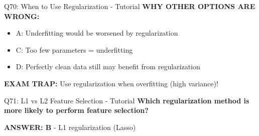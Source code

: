 \documentclass[8pt]{beamer}
\begin{document}
\begin{frame}{Q70: When to Use Regularization - Tutorial}
		\vspace{0.05cm}
		\textcolor{myred}{\textbf{WHY OTHER OPTIONS ARE WRONG:}}
		\begin{itemize}
			\item \textcolor{myred}{A:} Underfitting would be worsened by regularization
			\item \textcolor{myred}{C:} Too few parameters = underfitting
			\item \textcolor{myred}{D:} Perfectly clean data still may benefit from regularization
		\end{itemize}
		
		\textcolor{myred}{\textbf{EXAM TRAP:}} Use regularization when overfitting (high variance)!
	\end{frame}
	
	\begin{frame}{Q71: L1 vs L2 Feature Selection - Tutorial}
		\fontsize{6.5}{7.5}\selectfont
		\textbf{Which regularization method is more likely to perform feature selection?}
		
		\vspace{0.05cm}
		\textcolor{myblue}{\textbf{ANSWER: B}} - L1 regularization (Lasso)
		

\end{frame}
\end{document}
